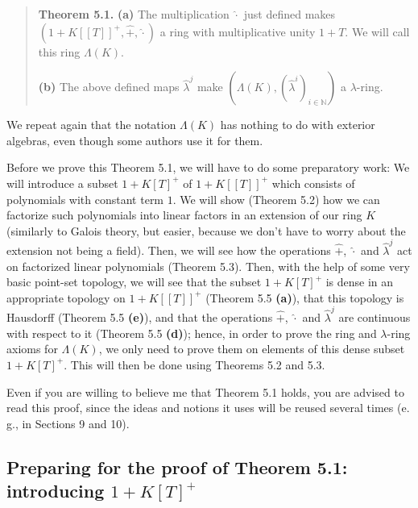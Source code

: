 \documentclass[numbers=enddot,12pt,final,onecolumn,notitlepage]{scrartcl}%
\begin{document}
\begin{quote}
\textbf{Theorem 5.1.} \textbf{(a)} The multiplication $\widehat{\cdot}$ just
defined makes $\left(  1+K\left[  \left[  T\right]  \right]  ^{+}%
,\widehat{+},\widehat{\cdot}\right)  $ a ring with multiplicative unity $1+T$.
We will call this ring $\Lambda\left(  K\right)  $.

\textbf{(b)} The above defined maps $\widehat{\lambda}^{j}$ make $\left(
\Lambda\left(  K\right)  ,\left(  \widehat{\lambda}^{i}\right)  _{i\in
\mathbb{N}}\right)  $ a $\lambda$-ring.
\end{quote}

We repeat again that the notation $\Lambda\left(  K\right)  $ has nothing to
do with exterior algebras, even though some authors use it for them.

Before we prove this Theorem 5.1, we will have to do some preparatory work: We
will introduce a subset $1+K\left[  T\right]  ^{+}$ of $1+K\left[  \left[
T\right]  \right]  ^{+}$ which consists of polynomials with constant term $1$.
We will show (Theorem 5.2) how we can factorize such polynomials into linear
factors in an extension of our ring $K$ (similarly to Galois theory, but
easier, because we don't have to worry about the extension not being a field).
Then, we will see how the operations $\widehat{+}$, $\widehat{\cdot}$ and
$\widehat{\lambda}^{j}$ act on factorized linear polynomials (Theorem 5.3).
Then, with the help of some very basic point-set topology, we will see that
the subset $1+K\left[  T\right]  ^{+}$ is dense in an appropriate topology on
$1+K\left[  \left[  T\right]  \right]  ^{+}$ (Theorem 5.5 \textbf{(a)}), that
this topology is Hausdorff (Theorem 5.5 \textbf{(e)}), and that the operations
$\widehat{+}$, $\widehat{\cdot}$ and $\widehat{\lambda}^{j}$ are continuous
with respect to it (Theorem 5.5 \textbf{(d)}); hence, in order to prove the
ring and $\lambda$-ring axioms for $\Lambda\left(  K\right)  $, we only need
to prove them on elements of this dense subset $1+K\left[  T\right]  ^{+}$.
This will then be done using Theorems 5.2 and 5.3.

Even if you are willing to believe me that Theorem 5.1 holds, you are advised
to read this proof, since the ideas and notions it uses will be reused several
times (e. g., in Sections 9 and 10).

\subsection{Preparing for the proof of Theorem 5.1: introducing $1+K\left[
T\right]  ^{+}$}
\end{document}
